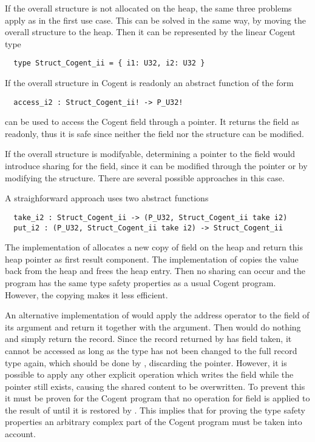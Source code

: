 If the overall structure is not allocated on the heap, the same three problems apply as in the first use case.
This can be solved in the same way, by moving the overall structure to the heap. Then it can be represented
by the linear Cogent type
\begin{verbatim}
  type Struct_Cogent_ii = { i1: U32, i2: U32 }
\end{verbatim}

If the overall structure in Cogent is readonly an abstract function of the form
\begin{verbatim}
  access_i2 : Struct_Cogent_ii! -> P_U32!
\end{verbatim}
can be used to access the Cogent field through a pointer. It returns the field as readonly, thus it is safe 
since neither the field nor the structure can be modified.

If the overall structure is modifyable, determining a pointer to the field would introduce sharing for the
field, since it can be modified through the pointer or by modifying the structure. There are several possible
approaches in this case.

A straighforward approach uses two abstract functions
\begin{verbatim}
  take_i2 : Struct_Cogent_ii -> (P_U32, Struct_Cogent_ii take i2)
  put_i2 : (P_U32, Struct_Cogent_ii take i2) -> Struct_Cogent_ii
\end{verbatim}
The implementation of  allocates a new copy of field  on the heap
and return this heap pointer as first result component. The implementation of  copies the 
value back from the heap and frees the heap entry. Then no sharing can occur and the program has the 
same type safety properties as a usual Cogent program. However, the copying makes it less efficient.

An alternative implementation of  would apply the address operator to the field  of 
its argument and return it together with the argument. Then  would do nothing and simply 
return the record. Since the record returned by  has field  taken, it
cannot be accessed as long as the type has not been changed to the full record type again, which should be 
done by , discarding the pointer. However, it is possible to apply any other explicit 
operation which writes the field  while the pointer still exists, causing the shared content to
be overwritten. To prevent this it must be proven for the Cogent program that no  operation for field 
 is applied to the result of  until it is restored by . This implies that
for proving the type safety properties an arbitrary complex part of the Cogent program must be taken into
account.

